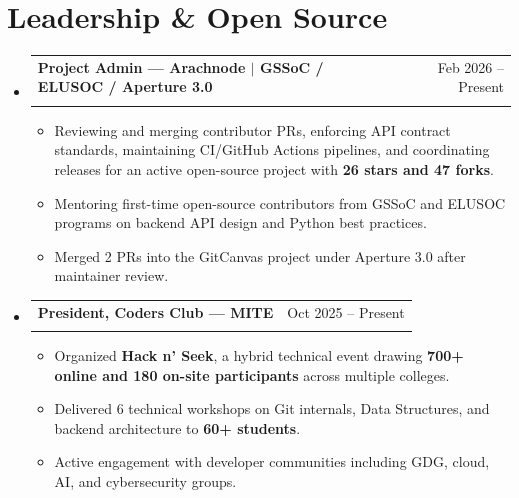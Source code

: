 \documentclass[letterpaper,10pt]{article}
\makeatletter
\newcommand{\resumeItem}[1]{
  \item\small{{#1 \vspace{-2pt}}}
}
\newcommand{\resumeSubheading}[4]{
  \vspace{-2pt}\item
    \begin{tabular*}{0.97\textwidth}[t]{l@{\extracolsep{\fill}}r}
      \textbf{#1} & #2 \\
      \textit{\small#3} & \textit{\small #4} \\
    \end{tabular*}\vspace{-7pt}
}
\newcommand{\resumeSubHeadingListStart}{\begin{itemize}[leftmargin=0.15in, label={}]}
\newcommand{\resumeSubHeadingListEnd}{\end{itemize}}
\newcommand{\resumeItemListStart}{\begin{itemize}[leftmargin=0.2in, itemsep=-1pt, topsep=0pt]}
\newcommand{\resumeItemListEnd}{\end{itemize}\vspace{-4pt}}
\makeatother
\begin{document}
\section{Leadership \& Open Source}
\resumeSubHeadingListStart

  \resumeSubheading
    {Project Admin --- Arachnode $|$ GSSoC / ELUSOC / Aperture 3.0}{Feb 2026 -- Present}{}{}
  \resumeItemListStart
    \resumeItem{Reviewing and merging contributor PRs, enforcing API contract standards, maintaining CI/GitHub Actions pipelines, and coordinating releases for an active open-source project with \textbf{26 stars and 47 forks}.}
    \resumeItem{Mentoring first-time open-source contributors from GSSoC and ELUSOC programs on backend API design and Python best practices.}
    \resumeItem{Merged 2 PRs into the GitCanvas project under Aperture 3.0 after maintainer review.}
  \resumeItemListEnd

  \resumeSubheading
    {President, Coders Club --- MITE}{Oct 2025 -- Present}{}{}
  \resumeItemListStart
    \resumeItem{Organized \textbf{Hack n' Seek}, a hybrid technical event drawing \textbf{700+ online and 180 on-site participants} across multiple colleges.}
    \resumeItem{Delivered 6 technical workshops on Git internals, Data Structures, and backend architecture to \textbf{60+ students}.}
    \resumeItem{Active engagement with developer communities including GDG, cloud, AI, and cybersecurity groups.}
  \resumeItemListEnd

\resumeSubHeadingListEnd
\end{document}
